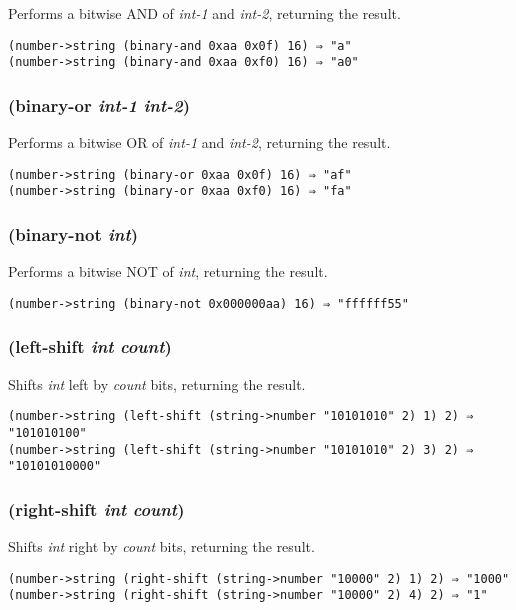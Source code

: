 \documentclass{article}
\begin{document}
Performs a bitwise AND of \emph{int-1} and \emph{int-2}, returning the result.

\begin{verbatim}
(number->string (binary-and 0xaa 0x0f) 16) ⇒ "a"
(number->string (binary-and 0xaa 0xf0) 16) ⇒ "a0"
\end{verbatim}

\subsubsection{(binary-or \emph{int-1} \emph{int-2})}

Performs a bitwise OR of \emph{int-1} and \emph{int-2}, returning the result.

\begin{verbatim}
(number->string (binary-or 0xaa 0x0f) 16) ⇒ "af"
(number->string (binary-or 0xaa 0xf0) 16) ⇒ "fa"
\end{verbatim}

\subsubsection{(binary-not \emph{int})}

Performs a bitwise NOT of \emph{int}, returning the result.

\begin{verbatim}
(number->string (binary-not 0x000000aa) 16) ⇒ "ffffff55"
\end{verbatim}

\subsubsection{(left-shift \emph{int} \emph{count})}

Shifts \emph{int} left by \emph{count} bits, returning the result.

\begin{verbatim}
(number->string (left-shift (string->number "10101010" 2) 1) 2) ⇒ "101010100"
(number->string (left-shift (string->number "10101010" 2) 3) 2) ⇒ "10101010000"
\end{verbatim}

\subsubsection{(right-shift \emph{int} \emph{count})}

Shifts \emph{int} right by \emph{count} bits, returning the result.

\begin{verbatim}
(number->string (right-shift (string->number "10000" 2) 1) 2) ⇒ "1000"
(number->string (right-shift (string->number "10000" 2) 4) 2) ⇒ "1"
\end{verbatim}
\end{document}
